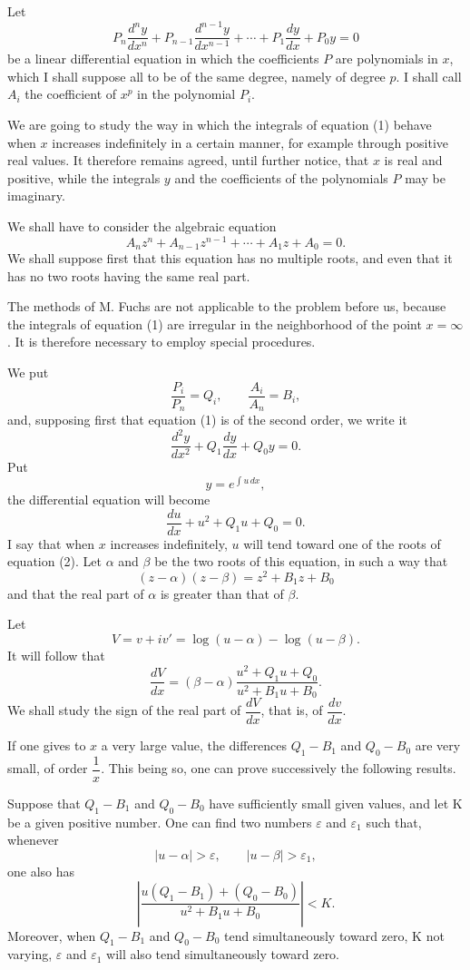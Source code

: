 \documentclass[11pt]{article}
\begin{document}
Let
\[
\tag{1}
P_n\frac{d^ny}{dx^n}+P_{n-1}\frac{d^{n-1}y}{dx^{n-1}}+\cdots+P_1\frac{dy}{dx}+P_0y=0
\]
be a linear differential equation in which the coefficients $P$ are polynomials in $x$, which I shall suppose all to be of the same degree, namely of degree $p$. I shall call $A_i$ the coefficient of $x^p$ in the polynomial $P_i$.

We are going to study the way in which the integrals of equation (1) behave when $x$ increases indefinitely in a certain manner, for example through positive real values. It therefore remains agreed, until further notice, that $x$ is real and positive, while the integrals $y$ and the coefficients of the polynomials $P$ may be imaginary.

We shall have to consider the algebraic equation
\[
\tag{2}
A_nz^n+A_{n-1}z^{n-1}+\cdots+A_1z+A_0=0.
\]
We shall suppose first that this equation has no multiple roots, and even that it has no two roots having the same real part.

The methods of M. Fuchs are not applicable to the problem before us, because the integrals of equation (1) are irregular in the neighborhood of the point $x=\infty$. It is therefore necessary to employ special procedures.

We put
\[
\frac{P_i}{P_n}=Q_i,
\qquad
\frac{A_i}{A_n}=B_i,
\]
and, supposing first that equation (1) is of the second order, we write it
\[
\frac{d^2y}{dx^2}+Q_1\frac{dy}{dx}+Q_0y=0.
\]
Put
\[
y=e^{\int u\,dx},
\]
the differential equation will become
\[
\frac{du}{dx}+u^2+Q_1u+Q_0=0.
\]
I say that when $x$ increases indefinitely, $u$ will tend toward one of the roots of equation (2). Let $\alpha$ and $\beta$ be the two roots of this equation, in such a way that
\[
(z-\alpha)(z-\beta)=z^2+B_1z+B_0
\]
and that the real part of $\alpha$ is greater than that of $\beta$.

Let
\[
V=v+iv'=\log(u-\alpha)-\log(u-\beta).
\]
It will follow that
\[
\frac{dV}{dx}=(\beta-\alpha)\frac{u^2+Q_1u+Q_0}{u^2+B_1u+B_0}.
\]
We shall study the sign of the real part of $\dfrac{dV}{dx}$, that is, of $\dfrac{dv}{dx}$.

If one gives to $x$ a very large value, the differences $Q_1-B_1$ and $Q_0-B_0$ are very small, of order $\dfrac1x$. This being so, one can prove successively the following results.

Suppose that $Q_1-B_1$ and $Q_0-B_0$ have sufficiently small given values, and let K be a given positive number. One can find two numbers $\varepsilon$ and $\varepsilon_1$ such that, whenever
\[
|u-\alpha|>\varepsilon,
\qquad
|u-\beta|>\varepsilon_1,
\]
one also has
\[
\tag{3}
\left|\frac{u(Q_1-B_1)+(Q_0-B_0)}{u^2+B_1u+B_0}\right|<K.
\]
Moreover, when $Q_1-B_1$ and $Q_0-B_0$ tend simultaneously toward zero, K not varying, $\varepsilon$ and $\varepsilon_1$ will also tend simultaneously toward zero.
\end{document}
